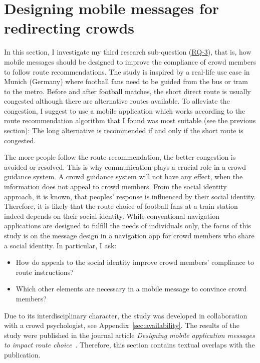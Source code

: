 \section{Designing mobile messages for redirecting crowds}


\label{sec:reaction}
In this section, I investigate my third research sub-question (\hyperref[reserachquestions]{RQ-3}), that is, how mobile messages should be designed to improve the compliance of crowd members to follow route recommendations.
The study is inspired by a real-life  use case in Munich (Germany) where football fans need to be guided from the bus or tram to the metro. Before and after football matches, the short direct route is usually congested although there are alternative routes available. To alleviate the congestion, I suggest to use a mobile application which works according to the route recommendation algorithm that I found was most suitable (see the previous section): The long alternative is recommended if and only if the short route is congested. 

The more people follow the route recommendation, the better congestion is avoided or resolved. This is why communication plays a crucial role in a crowd guidance system. A crowd guidance system will not have any effect, when the information does not appeal to crowd members. From the social identity approach, it is known, that  peoples' response is influenced by their social identity.
Therefore, it is likely that the route choice of football fans at a train station indeed depends on their social identity.
While conventional navigation applications are designed to fulfill the needs of individuals only, the focus of this study is on the message design in a navigation app for crowd members who share a social identity. In particular, I ask:
\begin{itemize}
\item How do appeals to the social identity improve crowd members' compliance to route instructions?
\item Which other elements are necessary in a mobile message to convince crowd members? 
\end{itemize}
Due to its interdisciplinary character, the study was developed in collaboration with a crowd psychologist, see Appendix~\ref{sec:availability}. The results of the study were published in the journal article \textit{Designing mobile application messages to impact route choice}~\cite{mayr-2023-cdyn}. Therefore, this section contains textual overlaps with the publication. 



